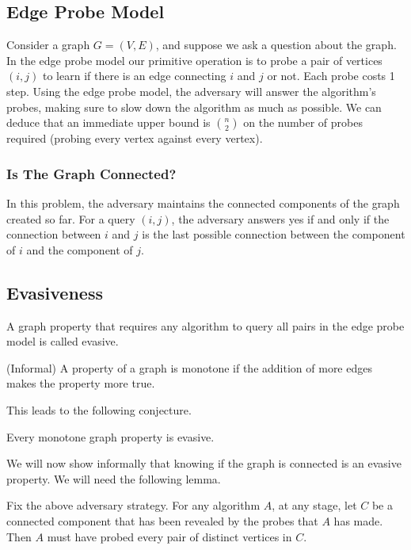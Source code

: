 \subsection{Edge Probe Model}

Consider a graph $G = (V, E)$, and suppose we ask a question about the
graph. In the edge probe model our
primitive operation is to probe a pair of vertices $(i, j)$ to learn
if there is an edge connecting $i$ and $j$ or not. Each probe costs 1
step. Using the edge probe model, the adversary will answer the
algorithm's probes, making sure to slow down the algorithm as much as
possible. We can deduce that an immediate upper bound is 
$\binom{n}{2}$ on the number of probes required (probing every vertex
against every vertex). 

\subsubsection{Is The Graph Connected?}

In this problem, the adversary maintains the connected components of
the graph created so far. For a query $(i, j)$, the adversary answers
yes if and only if the connection between $i$ and $j$ is the last
possible connection between the component of $i$ and the component of
$j$.

\subsection{Evasiveness}

\begin{definition}
    A graph property that requires any algorithm to query all pairs in
    the edge probe model is called evasive.
\end{definition}

\begin{definition}
    (Informal) A property of a graph is monotone if the addition of
    more edges makes the property more true.
\end{definition}

This leads to the following conjecture.

\begin{conjecture}
    Every monotone graph property is evasive.
\end{conjecture}

We will now show informally that knowing if the graph is connected is
an evasive property. We will need the following lemma.

\begin{lemma}\label{lemma:lem1}
    Fix the above adversary strategy. For any algorithm $A$, at any
stage, let $C$ be a connected component that has been revealed by the
probes that $A$ has made. Then $A$ must have probed every pair of
distinct vertices in $C$.
\end{lemma}

